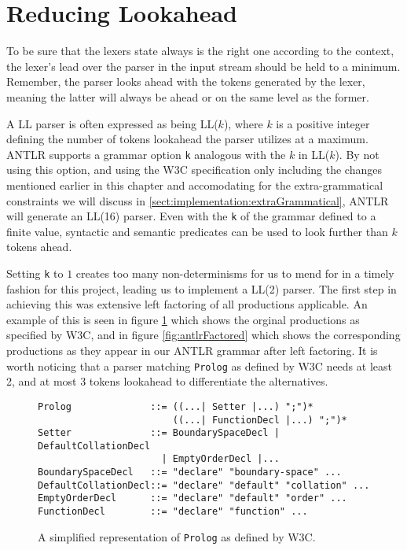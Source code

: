 \section{Reducing Lookahead}
\label{sect:implementation:reduceLookahead}
To be sure that the lexers state always is the right one according to the context, the lexer's lead over the parser in the input stream should be held to a minimum. Remember, the parser looks ahead with the tokens generated by the lexer, meaning the latter will always be ahead or on the same level as the former.

A LL parser is often expressed as being LL($k$), where $k$ is a positive integer defining the number of tokens lookahead the parser utilizes at a maximum. ANTLR supports a grammar option \verb!k! analogous with the $k$ in LL($k$). By not using this option, and using the W3C specification only including the changes mentioned earlier in this chapter and accomodating for the extra-grammatical constraints we will discuss in \ref{sect:implementation:extraGrammatical}, ANTLR will generate an LL(16) parser. Even with the \verb!k! of the grammar defined to a finite value, syntactic and semantic predicates can be used to look further than $k$ tokens ahead. 

Setting \verb!k! to $1$ creates too many non-determinisms for us to mend for in a timely fashion for this project, leading us to implement a LL(2) parser. The first step in achieving this was extensive left factoring of all productions applicable. An example of this is seen in figure \ref{fig:w3cUnfactored} which shows the orginal productions as specified by W3C, and in figure \ref{fig:antlrFactored} which shows the corresponding productions as they appear in our ANTLR grammar after left factoring. It is worth noticing that a parser matching \verb!Prolog! as defined by W3C needs at least 2, and at most 3 tokens lookahead to differentiate the alternatives.

\begin{figure}[h!]
\begin{Verbatim}
Prolog              ::= ((...| Setter |...) ";")* 
                        ((...| FunctionDecl |...) ";")*
Setter              ::= BoundarySpaceDecl | DefaultCollationDecl 
                      | EmptyOrderDecl |...
BoundarySpaceDecl   ::= "declare" "boundary-space" ...
DefaultCollationDecl::= "declare" "default" "collation" ...
EmptyOrderDecl      ::= "declare" "default" "order" ...
FunctionDecl        ::= "declare" "function" ...
\end{Verbatim}
\label{fig:w3cUnfactored}
\caption[\texttt{Prolog} as defined by W3C]{A simplified representation of \texttt{Prolog} as defined by W3C.}
\end{figure}

